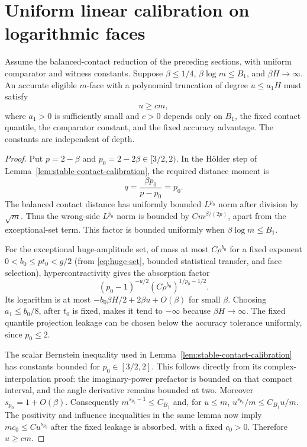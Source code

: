 \section{Uniform linear calibration on logarithmic faces}
\label{sec:uniform-calibration}
\begin{lemma}
\label{lem:uniform-linear-calibration}
Assume the balanced-contact reduction of the preceding sections, with
uniform comparator and witness constants. Suppose $\beta\le1/4$,
$\beta\log m\le B_1$, and $\beta H\to\infty$. An accurate eligible
$m$-face with a polynomial truncation of degree $u\le a_1H$ must satisfy
\[
 u\ge c m,
\]
where $a_1>0$ is sufficiently small and $c>0$ depends only on $B_1$,
the fixed contact quantile, the comparator constant, and the fixed
accuracy advantage. The constants are independent of depth.
\end{lemma}
\begin{proof}
Put $p=2-\beta$ and $p_0=2-2\beta\in[3/2,2)$. In the H\"older step
of Lemma~\ref{lem:stable-contact-calibration}, the required distance
moment is
\[
 q=\frac{\beta p_0}{p-p_0}=p_0.
\]
The balanced contact distance has uniformly bounded $L^{p_0}$ norm
after division by $\sqrt m$. Thus the wrong-side $L^{p_0}$ norm is
bounded by $Cm^{\beta/(2p)}$, apart from the exceptional-set term.
This factor is bounded uniformly when $\beta\log m\le B_1$.

For the exceptional huge-amplitude set, of mass at most $C\rho^{b_0}$ for
a fixed exponent $0<b_0\le pt_0<g/2$ (from \eqref{eq:huge-set},
bounded statistical transfer, and face selection), hypercontractivity
gives the absorption factor
\[
 (p_0-1)^{-u/2}(C\rho^{b_0})^{1/p_0-1/2}.
\]
Its logarithm is at most $-b_0\beta H/2+2\beta u+O(\beta)$ for small
$\beta$. Choosing $a_1\le b_0/8$, after $t_0$ is fixed, makes it tend to
$-\infty$ because $\beta H\to\infty$. The fixed quantile projection leakage can be
chosen below the accuracy tolerance uniformly, since $p_0\le2$.

The scalar Bernstein inequality used in
Lemma~\ref{lem:stable-contact-calibration} has constants bounded for
$p_0\in[3/2,2]$. This follows directly from its complex-interpolation
proof: the imaginary-power prefactor is bounded on that compact
interval, and the angle derivative remains bounded at two.
Moreover $s_{p_0}=1+O(\beta)$. Consequently
$m^{s_{p_0}-1}\le C_{B_1}$ and, for $u\le m$,
$u^{s_{p_0}}/m\le C_{B_1}u/m$.
The positivity and influence inequalities in the same lemma now imply
$mc_0\le Cu^{s_{p_0}}$ after the fixed leakage is absorbed, with a
fixed $c_0>0$. Therefore $u\ge cm$.
\end{proof}

